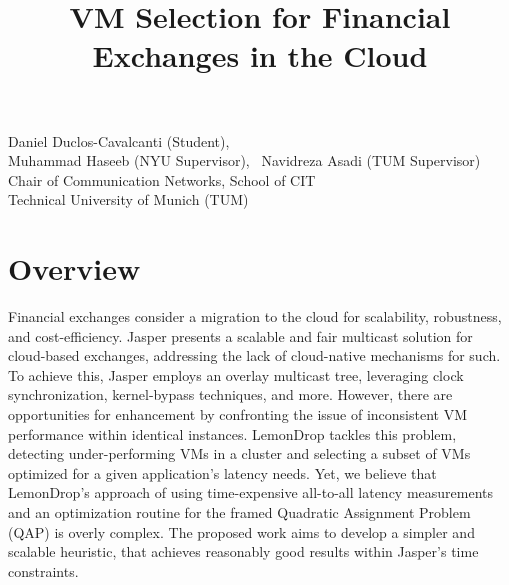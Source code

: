 \documentclass{article}
\title{VM Selection for Financial Exchanges in the Cloud}
\makeatletter
\renewcommand{\maketitle}{%
    \thispagestyle{fancy}%
    \begin{center}
        \Large\bfseries\@title
    \end{center}
    \vspace{-0.25cm}
    \begin{center}
        Daniel Duclos-Cavalcanti (Student),
        \\
        Muhammad Haseeb (NYU Supervisor),
        ~Navidreza Asadi (TUM Supervisor) 
        \\Chair of Communication Networks, School of CIT
        \\Technical University of Munich (TUM)
    \end{center}
}
\makeatother
\begin{document}
\maketitle

\section{Overview}


Financial exchanges consider a migration to the cloud for scalability, robustness, and cost-efficiency.
Jasper \cite{haseeb2024jasper} presents a scalable and fair multicast solution for cloud-based exchanges, 
addressing the lack of cloud-native mechanisms for such. 
To achieve this, Jasper employs an overlay multicast tree, leveraging clock synchronization, kernel-bypass techniques, 
and more.
However, there are opportunities for enhancement by confronting the issue of inconsistent VM performance 
within identical instances. LemonDrop \cite{sachidananda2022scheduling} tackles this problem, detecting under-performing VMs in a cluster 
and selecting a subset of VMs optimized for a given application's latency needs.
Yet, we believe that LemonDrop's approach of using time-expensive all-to-all latency measurements and an optimization routine 
for the framed Quadratic Assignment Problem (QAP) is overly complex. 
The proposed work aims to develop a simpler and scalable heuristic, that achieves reasonably good results
within Jasper's time constraints. 
\end{document}
